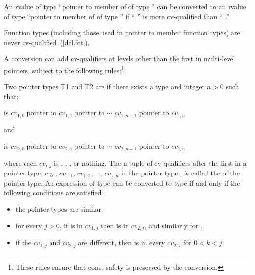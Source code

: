 \pnum
An rvalue of type ``pointer to member of  of type 
'' can be converted to an rvalue of type ``pointer to member
of  of type  '' if ``
'' is more cv-qualified than `` .''

\pnum
\enternote 
Function types (including those used in pointer to member function
types) are never cv-qualified~(\ref{dcl.fct}).
\exitnote 

\pnum
A conversion can add cv-qualifiers at levels other than the first in
multi-level pointers, subject to the following rules:\footnote{These rules ensure that const-safety is preserved by the conversion.}
\begin{indented}
Two pointer types T1 and T2 are  if there exists a
type  and integer $n > 0$ such that:

\begin{indented}
 is $\mathit{cv}_{1,0}$ pointer to $\mathit{cv}_{1,1}$ pointer
to $\cdots$ $\mathit{cv}_{1,n-1}$ pointer to $\mathit{cv}_{1,n}$
\end{indented}

and
\begin{indented}
 is $\mathit{cv}_{2,0}$ pointer to $\mathit{cv}_{2,1}$ pointer
to $\cdots$ $\mathit{cv}_{2,n-1}$ pointer to $\mathit{cv}_{2,n}$
\end{indented}

where each $\mathit{cv}_{i,j}$ is , ,
, or nothing. The n-tuple of cv-qualifiers after
the first in a pointer type, e.g.,
$\mathit{cv}_{1,1}$, $\mathit{cv}_{1,2}$, $\cdots$, $\mathit{cv}_{1,n}$
in the pointer type , is called the  of the pointer type. An expression of type  can be
converted to type  if and only if the following conditions are
satisfied:

\begin{itemize}
\item the pointer types are similar.

\item for every $j > 0$, if  is in $\mathit{cv}_{1,j}$ then  is in $\mathit{cv}_{2,j}$, and similarly for .

\item if the $\mathit{cv}_{1,j}$ and $\mathit{cv}_{2,j}$ are different,
then  is in every $\mathit{cv}_{2,k}$ for $0 < k < j$.
\end{itemize}
\end{indented}

